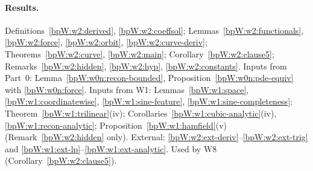 \paragraph{Results.}
Definitions~\ref{bpW:w2:derived}, \ref{bpW:w2:coeffsol}; Lemmas~\ref{bpW:w2:functionals}, \ref{bpW:w2:force},
\ref{bpW:w2:orbit}, \ref{bpW:w2:curve-deriv}; Theorems~\ref{bpW:w2:curve}, \ref{bpW:w2:main};
Corollary~\ref{bpW:w2:clause5}; Remarks~\ref{bpW:w2:hidden}, \ref{bpW:w2:hyp}, \ref{bpW:w2:constants}. Inputs from
Part~0: Lemma~\ref{bpW:w0n:recon-bounded}, Proposition~\ref{bpW:w0n:pde-equiv} with \eqref{bpW:w0n:force}. Inputs from
W1: Lemmas~\ref{bpW:w1:space}, \ref{bpW:w1:coordinatewise}, \ref{bpW:w1:sine-feature},
\ref{bpW:w1:sine-completeness}; Theorem~\ref{bpW:w1:trilinear}(iv); Corollaries~\ref{bpW:w1:cubic-analytic}(iv),
\ref{bpW:w1:recon-analytic}; Proposition~\ref{bpW:w1:hamfield}(v) (Remark~\ref{bpW:w2:hidden} only). External:
\ref{bpW:w2:ext-deriv}--\ref{bpW:w2:ext-trig} and \ref{bpW:w1:ext-lp}--\ref{bpW:w1:ext-analytic}. Used by W8
(Corollary~\ref{bpW:w2:clause5}).

